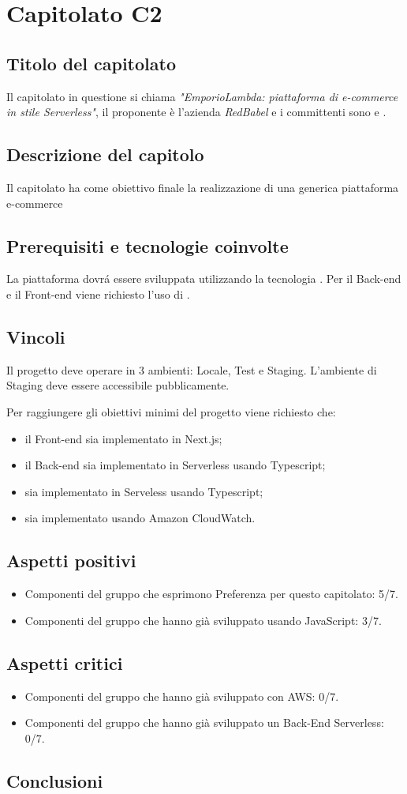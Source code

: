 \section{Capitolato C2}
\subsection{Titolo del capitolato}
Il capitolato in questione si chiama \textit{"EmporioLambda: piattaforma di e-commerce in stile Serverless"}, il proponente \`e l'azienda \textit{RedBabel} e i committenti sono \VT{} e \CR{}.

\subsection{Descrizione del capitolo}
Il capitolato ha come obiettivo finale la realizzazione di una generica piattaforma e-commerce 

\subsection{Prerequisiti e tecnologie coinvolte}
La piattaforma dovr\'a essere sviluppata utilizzando la tecnologia .
Per il Back-end e il Front-end viene richiesto l'uso di .

\subsection{Vincoli}
Il progetto deve operare in 3 ambienti: Locale, Test e Staging.
L'ambiente di Staging deve essere accessibile pubblicamente.

Per raggiungere gli obiettivi minimi del progetto viene richiesto che:

\begin{itemize}
\item il Front-end sia implementato in Next.js;
\item il Back-end sia implementato in Serverless usando Typescript;
\item {} sia implementato in Serveless usando Typescript;
\item {} sia implementato usando Amazon CloudWatch.
\end{itemize}

\subsection{Aspetti positivi}
\begin{itemize}
\item Componenti del gruppo che esprimono Preferenza per questo capitolato: 5/7.
\item Componenti del gruppo che hanno già sviluppato usando JavaScript: 3/7.
\end{itemize}

\subsection{Aspetti critici}
\begin{itemize}
\item Componenti del gruppo che hanno già sviluppato con AWS: 0/7.
\item Componenti del gruppo che hanno già sviluppato un Back-End Serverless: 0/7.
\end{itemize}

\subsection{Conclusioni}

